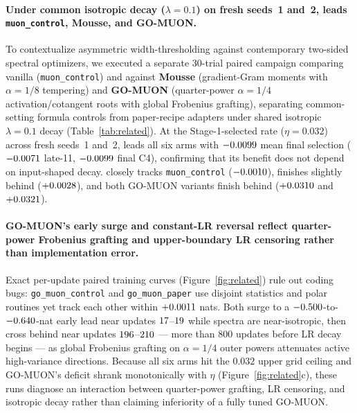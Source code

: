 \paragraph{Under common isotropic decay ($\lambda=0.1$) on fresh seeds~1 and~2,  leads \texttt{muon\_control}, Mousse, and GO-MUON.}
To contextualize asymmetric width-thresholding against contemporary two-sided
spectral optimizers, we executed a separate 30-trial paired campaign comparing
vanilla  (\texttt{muon\_control}) and  against
\textbf{Mousse} \citep{zhang2026mousse} (gradient-Gram moments with $\alpha=1/8$
tempering) and \textbf{GO-MUON} \citep{che2026gomuon} (quarter-power
$\alpha=1/4$ activation/cotangent roots with global Frobenius grafting),
separating common-setting formula controls from paper-recipe adapters under
shared isotropic $\lambda = 0.1$ decay (Table~\ref{tab:related}). At the
Stage-1-selected rate ($\eta = 0.032$) across fresh seeds~1 and~2,
 leads all six arms with $-0.0099{}$ mean final
selection ($-0.0071{}$ late-11, $-0.0099{}$
final C4), confirming that its benefit does not depend on input-shaped decay.
 closely tracks \texttt{muon\_control}
($-0.0010{}$),  finishes slightly
behind ($+0.0028{}$), and both GO-MUON variants finish
behind ($+0.0310{}$ and $+0.0321{}$).

\paragraph{GO-MUON's early surge and constant-LR reversal reflect quarter-power Frobenius grafting and upper-boundary LR censoring rather than implementation error.}
Exact per-update paired training curves (Figure~\ref{fig:related}) rule out
coding bugs: \texttt{go\_muon\_control} and \texttt{go\_muon\_paper} use
disjoint statistics and polar routines yet track each other within
$+0.0011{}$ nats. Both surge to a
$-0.500{}$-to-$-0.640{}$-nat early lead near
updates $17{}$--$19{}$ while
spectra are near-isotropic, then cross behind  near updates
$196{}$--$210{}$ --- more than $800$
updates before LR decay begins --- as global Frobenius grafting on $\alpha=1/4$
outer powers attenuates active high-variance directions. Because all six arms
hit the $0.032$ upper grid ceiling and GO-MUON's deficit shrank monotonically
with $\eta$ (Figure~\ref{fig:related}c), these runs diagnose an interaction
between quarter-power grafting, LR censoring, and isotropic decay rather than
claiming inferiority of a fully tuned GO-MUON.

